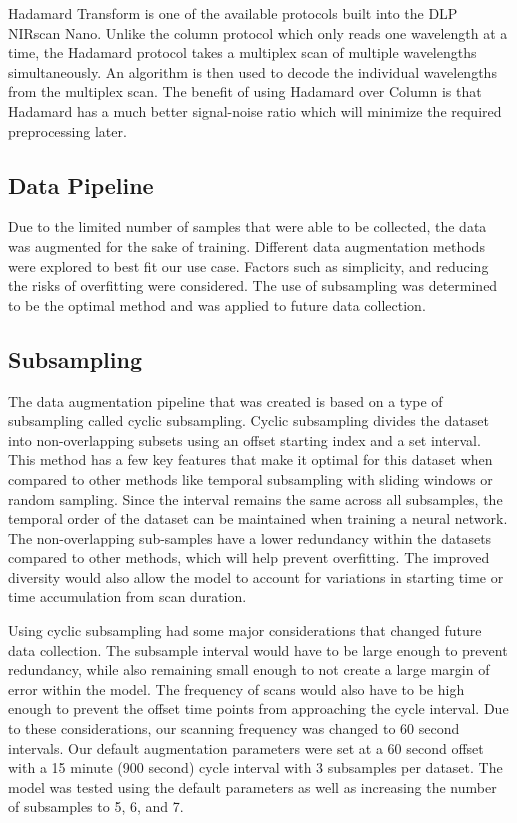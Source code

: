 \documentclass[12pt]{report}
\begin{document}
Hadamard Transform is one of the available protocols built into the DLP NIRscan Nano. Unlike the column protocol which only reads one wavelength at a time, the Hadamard protocol takes a multiplex scan of multiple wavelengths simultaneously. An algorithm is then used to decode the individual wavelengths from the multiplex scan. The benefit of using Hadamard over Column is that Hadamard has a much better signal-noise ratio which will minimize the required preprocessing later.

\subsection{Data Pipeline}

Due to the limited number of samples that were able to be collected, the data was augmented for the sake of training. Different data augmentation methods were explored to best fit our use case. Factors such as simplicity, and reducing the risks of overfitting were considered. The use of subsampling was determined to be the optimal method and was applied to future data collection.

\subsection{Subsampling}
The data augmentation pipeline that was created is based on a type of subsampling called cyclic subsampling. Cyclic subsampling divides the dataset into non-overlapping subsets using an offset starting index and a set interval. This method has a few key features that make it optimal for this dataset when compared to other methods like temporal subsampling with sliding windows or random sampling. Since the interval remains the same across all subsamples, the temporal order of the dataset can be maintained when training a neural network. The non-overlapping sub-samples have a lower redundancy within the datasets compared to other methods, which will help prevent overfitting. The improved diversity would also allow the model to account for variations in starting time or time accumulation from scan duration.

Using cyclic subsampling had some major considerations that changed future data collection. The subsample interval would have to be large enough to prevent redundancy, while also remaining small enough to not create a large margin of error within the model. The frequency of scans would also have to be high enough to prevent the offset time points from approaching the cycle interval. Due to these considerations, our scanning frequency was changed to 60 second intervals. Our default augmentation parameters were set at a 60 second offset with a 15 minute (900 second) cycle interval with 3 subsamples per dataset. The model was tested using the default parameters as well as increasing the number of subsamples to 5, 6, and 7.
\end{document}
